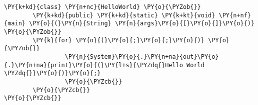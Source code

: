 \begin{Verbatim}[commandchars=\\\{\}]
\PY{k+kd}{class} \PY{n+nc}{HelloWorld} \PY{o}{\PYZob{}}
        \PY{k+kd}{public} \PY{k+kd}{static} \PY{k+kt}{void} \PY{n+nf}{main} \PY{o}{(}\PY{n}{String} \PY{n}{args}\PY{o}{[}\PY{o}{]}\PY{o}{)} \PY{o}{\PYZob{}}
        \PY{k}{for} \PY{o}{(}\PY{o}{;}\PY{o}{;}\PY{o}{)} \PY{o}{\PYZob{}}
                 \PY{n}{System}\PY{o}{.}\PY{n+na}{out}\PY{o}{.}\PY{n+na}{print}\PY{o}{(}\PY{l+s}{\PYZdq{}Hello World \PYZdq{}}\PY{o}{)}\PY{o}{;}
                 \PY{o}{\PYZcb{}}
        \PY{o}{\PYZcb{}}
\PY{o}{\PYZcb{}}
\end{Verbatim}
